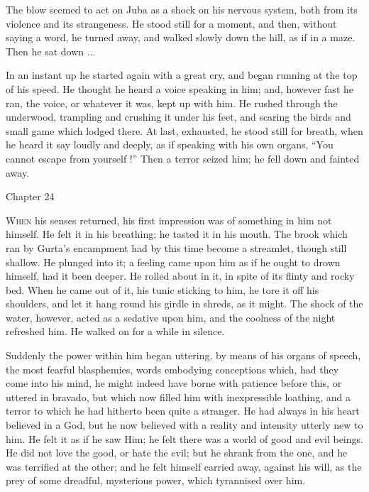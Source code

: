 The blow seemed to act on Juba as a shock on his nervous system,
both from its violence and its strangeness. He stood still for a
moment, and then, without saying a word, he turned away, and walked
slowly down the hill, as if in a maze. Then he sat down ...

In an instant up he started again with a great cry, and began
running at the top of his speed. He thought he heard a voice speaking
in him; and, however fast he ran, the voice, or whatever it was,
kept up with him. He rushed through the underwood, trampling and
crushing it under his feet, and scaring the birds and small game which
lodged there. At last, exhausted, he stood still for breath, when he
heard it say loudly and deeply, as if speaking with his own organs,
``You cannot escape from yourself !'' Then a terror seized him;
he fell down and fainted away.

Chapter 24


W\textsc{hen} his senses returned, his first impression was of
something in him not himself. He felt it in his breathing; he tasted
it in his mouth. The brook which ran by Gurta's encampment had by this
time become a streamlet, though still shallow. He plunged into it; a
feeling came upon him as if he ought to drown himself, had it been
deeper. He rolled about in it, in spite of its flinty and rocky bed.
When he came out of it, his tunic sticking to him, he tore it off his
shoulders, and let it hang round his girdle in shreds, as it might.
The shock of the water, however, acted as a sedative upon him, and the
coolness of the night refreshed him. He walked on for a while in
silence.

Suddenly the power within him began uttering, by means of his
organs of speech, the most fearful blasphemies, words embodying
conceptions which, had they come into his mind, he might indeed have
borne with patience before this, or uttered in bravado, but which now
filled him with inexpressible loathing, and a terror to which he had
hitherto been quite a stranger. He had always in his heart believed in
a God, but he now believed with a reality and intensity utterly
new to him. He felt it as if he saw Him; he felt there was a world of
good and evil beings. He did not love the good, or hate the evil; but
he shrank from the one, and he was terrified at the other; and he felt
himself carried away, against his will, as the prey of some dreadful,
mysterious power, which tyrannised over him.

